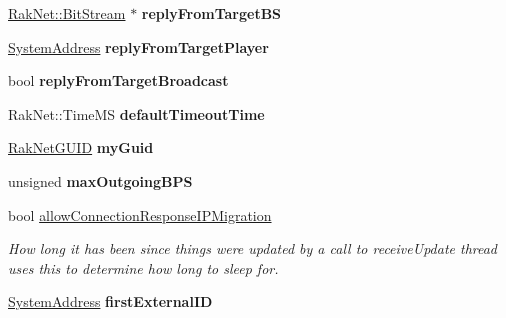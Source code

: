 \begin{DoxyCompactItemize}
\item 
\hypertarget{class_rak_net_1_1_rak_peer_a368120814e5d585f64defd9b9ef50ae1}{\hyperlink{class_rak_net_1_1_bit_stream}{Rak\-Net\-::\-Bit\-Stream} $\ast$ {\bfseries reply\-From\-Target\-B\-S}}\label{class_rak_net_1_1_rak_peer_a368120814e5d585f64defd9b9ef50ae1}

\item 
\hypertarget{class_rak_net_1_1_rak_peer_a43f7e423b48f0f4a8da76ccbe0311ed8}{\hyperlink{struct_rak_net_1_1_system_address}{System\-Address} {\bfseries reply\-From\-Target\-Player}}\label{class_rak_net_1_1_rak_peer_a43f7e423b48f0f4a8da76ccbe0311ed8}

\item 
\hypertarget{class_rak_net_1_1_rak_peer_a9be6eecf9b8b8d481679ac7aabd410d0}{bool {\bfseries reply\-From\-Target\-Broadcast}}\label{class_rak_net_1_1_rak_peer_a9be6eecf9b8b8d481679ac7aabd410d0}

\item 
\hypertarget{class_rak_net_1_1_rak_peer_a956da30d9e3a2f44070d45a4f43c1ca3}{Rak\-Net\-::\-Time\-M\-S {\bfseries default\-Timeout\-Time}}\label{class_rak_net_1_1_rak_peer_a956da30d9e3a2f44070d45a4f43c1ca3}

\item 
\hypertarget{class_rak_net_1_1_rak_peer_a7ab4c1b3d812acb9238a705e0c91693c}{\hyperlink{struct_rak_net_1_1_rak_net_g_u_i_d}{Rak\-Net\-G\-U\-I\-D} {\bfseries my\-Guid}}\label{class_rak_net_1_1_rak_peer_a7ab4c1b3d812acb9238a705e0c91693c}

\item 
\hypertarget{class_rak_net_1_1_rak_peer_a8a9f738330d41078ff6cd22849123a8a}{unsigned {\bfseries max\-Outgoing\-B\-P\-S}}\label{class_rak_net_1_1_rak_peer_a8a9f738330d41078ff6cd22849123a8a}

\item 
bool \hyperlink{class_rak_net_1_1_rak_peer_a9d820f9f09600401b3689a599242832a}{allow\-Connection\-Response\-I\-P\-Migration}
\begin{DoxyCompactList}\small\item\em How long it has been since things were updated by a call to receive\-Update thread uses this to determine how long to sleep for. \end{DoxyCompactList}\item 
\hypertarget{class_rak_net_1_1_rak_peer_a13a842bb2aaeb98bda26b37e265e5f3b}{\hyperlink{struct_rak_net_1_1_system_address}{System\-Address} {\bfseries first\-External\-I\-D}}\label{class_rak_net_1_1_rak_peer_a13a842bb2aaeb98bda26b37e265e5f3b}


\end{DoxyCompactItemize}
